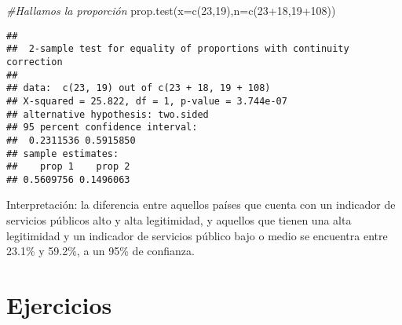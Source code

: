\documentclass[
]{article}
\newenvironment{Shaded}{\begin{snugshade}}{\end{snugshade}}
\newcommand{\AttributeTok}[1]{\textcolor[rgb]{0.77,0.63,0.00}{#1}}
\newcommand{\CommentTok}[1]{\textcolor[rgb]{0.56,0.35,0.01}{\textit{#1}}}
\newcommand{\DecValTok}[1]{\textcolor[rgb]{0.00,0.00,0.81}{#1}}
\newcommand{\FunctionTok}[1]{\textcolor[rgb]{0.00,0.00,0.00}{#1}}
\newcommand{\NormalTok}[1]{#1}
\newcommand{\SpecialCharTok}[1]{\textcolor[rgb]{0.00,0.00,0.00}{#1}}
\begin{document}
\begin{Shaded}
\begin{Highlighting}[]
\CommentTok{\#Hallamos la proporción}
\FunctionTok{prop.test}\NormalTok{(}\AttributeTok{x=}\FunctionTok{c}\NormalTok{(}\DecValTok{23}\NormalTok{,}\DecValTok{19}\NormalTok{),}\AttributeTok{n=}\FunctionTok{c}\NormalTok{(}\DecValTok{23}\SpecialCharTok{+}\DecValTok{18}\NormalTok{,}\DecValTok{19}\SpecialCharTok{+}\DecValTok{108}\NormalTok{))}
\end{Highlighting}
\end{Shaded}

\begin{verbatim}
## 
##  2-sample test for equality of proportions with continuity correction
## 
## data:  c(23, 19) out of c(23 + 18, 19 + 108)
## X-squared = 25.822, df = 1, p-value = 3.744e-07
## alternative hypothesis: two.sided
## 95 percent confidence interval:
##  0.2311536 0.5915850
## sample estimates:
##    prop 1    prop 2 
## 0.5609756 0.1496063
\end{verbatim}

Interpretación: la diferencia entre aquellos países que cuenta con un
indicador de servicios públicos alto y alta legitimidad, y aquellos que
tienen una alta legitimidad y un indicador de servicios público bajo o
medio se encuentra entre 23.1\% y 59.2\%, a un 95\% de confianza.

\hypertarget{ejercicios}{%
\section{\texorpdfstring{\textbf{Ejercicios}}{Ejercicios}}\label{ejercicios}}
\end{document}
